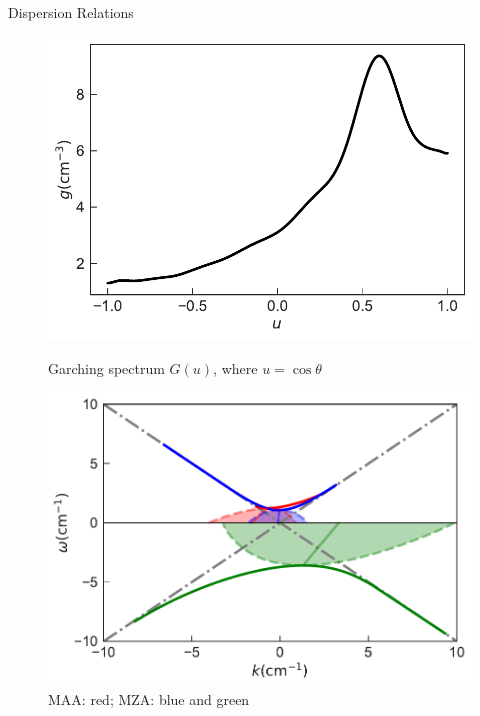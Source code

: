 \documentclass[9pt]{beamer}
\begin{document}
\begin{darkframes}
\begin{frame}{Dispersion Relations}
   \begin{figure}
        \includegraphics[width=\linewidth]{assets/dr/spectGarchingPlt.pdf}
        \caption*{Garching spectrum $G(u)$, where $u=\cos\theta$}
      \endminipage\hfill
      \includegraphics[width=\linewidth]{assets/dr/spectGarchingDRLSAPltBlob.pdf}
      \caption*{ MAA: red; MZA: blue and green }
      \endminipage\hfill
   \end{figure}



\end{frame}
\end{darkframes}
\end{document}
